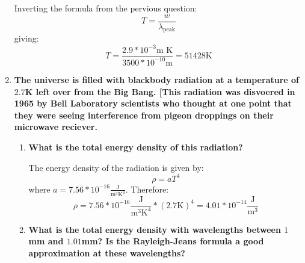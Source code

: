 \documentclass[9pt]{report}
\begin{document}
\begin{enumerate}
          Inverting the formula from the pervious question:
          \[
            T = \frac{w}{\lambda_\text{peak}}
          \]
          giving:
          \[
            T = \frac{2.9 * 10^{-3} \text{m K}}{ 3500 * 10^{-10} \text{m}} = 51428 \text{K}
          \]

        \item \textbf{The universe is filled with blackbody radiation at a temperature
            of $2.7$K left over from the Big Bang. [This radiation was disvoered in
          1965 by Bell Laboratory scientists who thought at one point that they were seeing
          interference from pigeon droppings on their microwave reciever.}
          \begin{enumerate}
          \item
            \textbf{What is the total energy density of this radiation?}

            The  energy density of the radiation is given by:
              \[
                \rho = a T^4
              \]
              where $a = 7.56 * 10^{-16} \frac{\text{J}}{\text{m}^3 \text{K}^4}$.
              Therefore:
              \[
                \rho = 7.56 * 10^{-16} \frac{\text{J}}{\text{m}^3 \text{K}^4} * (2.7\text{K})^4 = 4.01 * 10^{-14} \frac{\text{J}}{\text{m}^3}
              \]
          \item
            \textbf{What is the total energy density with wavelengths between
            $1$mm and $1.01$mm? Is the Rayleigh-Jeans formula a good approximation
            at these wavelengths?}
          \end{enumerate}
  \end{enumerate}
\end{document}
